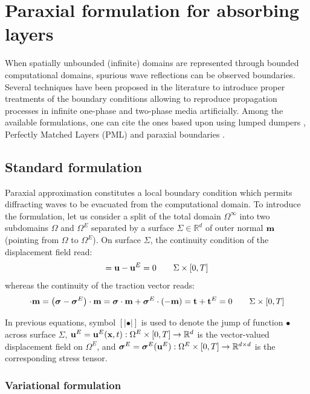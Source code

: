 \documentclass{report}
\newcommand{\bx}{\textbf{x}}
\newcommand{\bu}{\textbf{u}}
\newcommand{\bt}{\boldsymbol t}
\def\bsigma{\mbox{\boldmath${\sigma}$}}
\def\bm{{\bf m}}
\def\bx{{\bf{x}}}
\def\bt{{\bf t}}
\def\bu{{\bf{u}}}
\begin{document}
\section{Paraxial formulation for absorbing layers}

When spatially unbounded (infinite) domains are represented through bounded computational domains, spurious wave reflections can be observed boundaries.
Several techniques have been proposed in the literature to introduce proper treatments of the boundary conditions allowing to reproduce propagation processes in infinite one-phase and two-phase media artificially. Among the available formulations, one can cite the ones based upon using lumped dumpers \cite{lysmer1969finite}, Perfectly Matched Layers
(PML) \cite{berenger1994perfectly} and paraxial boundaries \cite{engquist1977absorbing,clayton1977absorbing,aubry1985local,MODARESSI1994117}.

\subsection{Standard formulation}

Paraxial approximation constitutes a local boundary condition which permits diffracting waves to be evacuated from the computational domain. To introduce the formulation, let us consider a split of the total domain $\Omega^{\infty}$ into two subdomains $\Omega$ and $\Omega^{E}$ separated by a surface $\Sigma\in\mathbb{R}^{d}$ of outer normal $\bm{}$ (pointing from $\Omega$ to $\Omega^{E}$). On surface $\Sigma$, the continuity condition of the displacement field read:
\begin{equation}
[|\bu|]=\bu-\bu^{E}=0\qquad\Sigma\times[0,T]
\end{equation}
%
whereas the continuity of the traction vector reads:
%
\begin{equation}
[|\bsigma|]\cdot\bm{}=\left(\bsigma-\bsigma^{E}\right)\cdot\bm{}=\bsigma\cdot\bm{}+\bsigma^{E}\cdot(-\bm{})=\bt+\bt^{E}=0\qquad\Sigma\times[0,T]\label{eq:paraxial_continuity_t}
\end{equation}

In previous equations, symbol $[|\bullet|]$ is used to denote the jump of function $\bullet$ across surface $\Sigma$, $\bu^{E}=\bu^{E}(\bx,t):\Omega^{E}\times[0,T]\to\mathbb{R}^{d}$ is the vector-valued displacement field on $\Omega^{E}$, and $\bsigma^{E}=\bsigma^{E}(\bu^{E}):\Omega^{E}\times[0,T]\to\mathbb{R}^{d\times d}$ is the corresponding stress tensor.

\subsubsection{Variational formulation}
\end{document}
